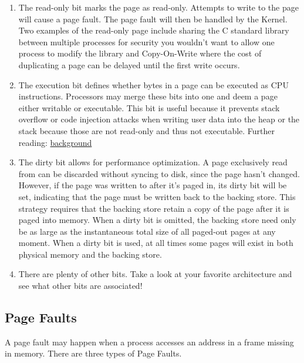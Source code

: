 \begin{enumerate}
	\item The read-only bit marks the page as read-only.
	      Attempts to write to the page will cause a page fault.
	      The page fault will then be handled by the Kernel.
	      Two examples of the read-only page include sharing the C standard library between multiple processes for security you wouldn't want to allow one process to modify the library and Copy-On-Write where the cost of duplicating a page can be delayed until the first write occurs.
	      	 
	\item The execution bit defines whether bytes in a page can be executed as CPU instructions.
	      Processors may merge these bits into one and deem a page either writable or executable.
	      This bit is useful because it prevents stack overflow or code injection attacks when writing user data into the heap or the stack because those are not read-only and thus not executable.
	      Further reading: \href{http://en.wikipedia.org/wiki/NX\_bit\#Hardware\_background}{background}
	      	 
	\item The dirty bit allows for performance optimization.
	      A page exclusively read from can be discarded without syncing to disk, since the page hasn't changed.
	      However, if the page was written to after it's paged in, its dirty bit will be set, indicating that the page must be written back to the backing store.
	      This strategy requires that the backing store retain a copy of the page after it is paged into memory.
	      When a dirty bit is omitted, the backing store need only be as large as the instantaneous total size of all paged-out pages at any moment.
	      When a dirty bit is used, at all times some pages will exist in both physical memory and the backing store.
	\item There are plenty of other bits. Take a look at your favorite architecture and see what other bits are associated!
\end{enumerate}
	 
\subsection{Page Faults}
	 
A page fault may happen when a process accesses an address in a frame missing in memory.
There are three types of Page Faults.
	 
